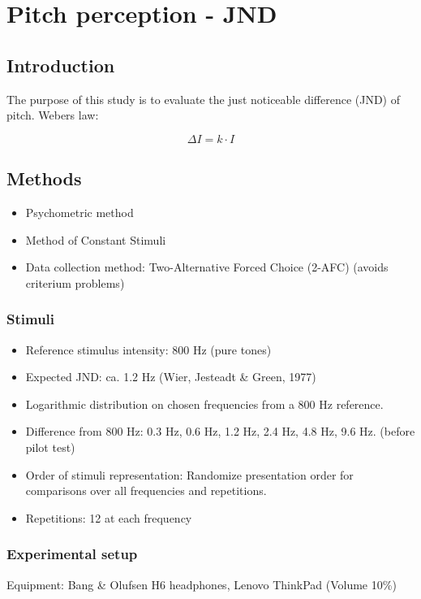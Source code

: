 \chapter*{Pitch perception - JND}

\section*{Introduction}
The purpose of this study is to evaluate the just noticeable difference (JND) of pitch.
Webers law:

\begin{equation}
\Delta I = k \cdot I
\end{equation}

\section*{Methods}
%
\begin{itemize}
  \item Psychometric method
  \item Method of Constant Stimuli
  \item Data collection method: Two-Alternative Forced Choice (2-AFC) (avoids criterium problems)
\end{itemize}


\subsection*{Stimuli}
%
\begin{itemize}
\item Reference stimulus intensity: 800 Hz (pure tones)
\item Expected JND: ca. 1.2 Hz (Wier, Jesteadt \& Green, 1977)
\item Logarithmic distribution on chosen frequencies from a 800 Hz reference.
\item Difference from 800 Hz: 0.3 Hz, 0.6 Hz, 1.2 Hz, 2.4 Hz, 4.8 Hz, 9.6 Hz. (before pilot test)
\item Order of stimuli representation: Randomize presentation order for comparisons over all frequencies and repetitions.
\item Repetitions: 12 at each frequency 
\end{itemize}


\subsection*{Experimental setup}
Equipment: Bang \& Olufsen H6 headphones, Lenovo ThinkPad (Volume 10\%)

